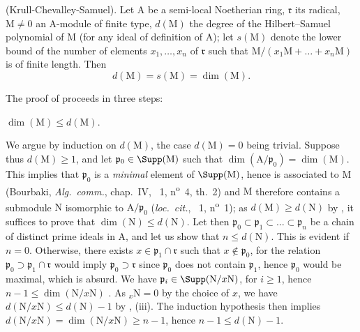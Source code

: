 \begin{theorem}[16.2.3]
\label{0.16.2.3}
\textup{(Krull-Chevalley-Samuel).}
Let $\mathrm{A}$ be a semi-local Noetherian ring, $\mathfrak{r}$ its radical, $\mathrm{M}\neq 0$ an $\mathrm{A}$-module of finite type, $d(\mathrm{M})$ the degree of the Hilbert--Samuel polynomial of $\mathrm{M}$ (for any ideal of definition of $\mathrm{A}$); let $s(\mathrm{M})$ denote the lower bound of the number of elements $x_1,\ldots,x_n$ of $\mathfrak{r}$ such that $\mathrm{M}/(x_1\mathrm{M}+\ldots+x_n\mathrm{M})$ is of finite length.
Then
\[
  d(\mathrm{M})=s(\mathrm{M})=\dim(\mathrm{M}).
\]
\end{theorem}

The proof of  proceeds in three steps:

\begin{env}[16.2.3.2]
\label{0.16.2.3.2}
$\dim(\mathrm{M})\leq d(\mathrm{M})$.
\end{env}

We argue by induction on $d(\mathrm{M})$, the case $d(\mathrm{M})=0$ being trivial.
Suppose thus $d(\mathrm{M})\geq 1$, and let $\mathfrak{p}_0\in\Supp(\mathrm{M})$ such that $\dim(\mathrm{A}/\mathfrak{p}_0)=\dim(\mathrm{M})$.
This implies that $\mathfrak{p}_0$ is a \emph{minimal} element of $\Supp(\mathrm{M})$, hence is associated to $\mathrm{M}$ (Bourbaki, \emph{Alg.~comm.}, chap.~IV, \textsection~1, n\textsuperscript{o}~4, th.~2) and $\mathrm{M}$ therefore contains a submodule $\mathrm{N}$ isomorphic to $\mathrm{A}/\mathfrak{p}_0$ (\emph{loc.~cit.}, \textsection~1, n\textsuperscript{o}~1); as $d(\mathrm{M})\geq d(\mathrm{N})$ by , it suffices to prove that $\dim(\mathrm{N})\leq d(\mathrm{N})$.
Let then $\mathfrak{p}_0\subset\mathfrak{p}_1\subset\ldots\subset\mathfrak{p}_n$ be a chain of distinct prime ideals in $\mathrm{A}$, and let us show that $n\leq d(\mathrm{N})$.
This is evident if $n=0$.
Otherwise, there exists $x\in\mathfrak{p}_1\cap\mathfrak{r}$ such that $x\notin\mathfrak{p}_0$, for the relation $\mathfrak{p}_0\supset\mathfrak{p}_1\cap\mathfrak{r}$ would imply $\mathfrak{p}_0\supset\mathfrak{r}$ since $\mathfrak{p}_0$ does not contain $\mathfrak{p}_1$, hence $\mathfrak{p}_0$ would be maximal, which is absurd.
We have $\mathfrak{p}_i\in\Supp(\mathrm{N}/x\mathrm{N})$, for $i\geq 1$, hence $n-1\leq\dim(\mathrm{N}/x\mathrm{N})$ .
As ${}_x\mathrm{N}=0$ by the choice of $x$, we have $d(\mathrm{N}/x\mathrm{N})\leq d(\mathrm{N})-1$ by , (iii).
The induction hypothesis then implies $d(\mathrm{N}/x\mathrm{N})=\dim(\mathrm{N}/x\mathrm{N})\geq n-1$, hence $n-1\leq d(\mathrm{N})-1$.

